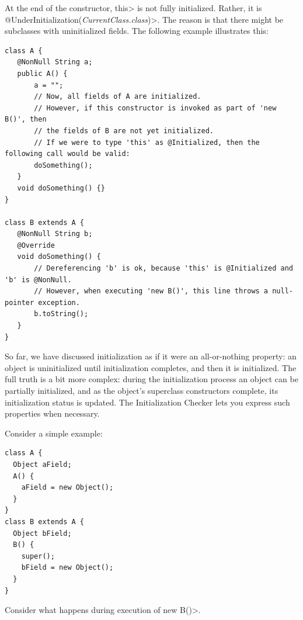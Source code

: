
At the end of the constructor, \<this> is not fully initialized. Rather,
it is \<@UnderInitialization(\emph{CurrentClass.class})>.
The reason is that there might be subclasses with uninitialized fields.
The following example illustrates this:

\begin{Verbatim}
class A {
   @NonNull String a;
   public A() {
       a = "";
       // Now, all fields of A are initialized.
       // However, if this constructor is invoked as part of 'new B()', then
       // the fields of B are not yet initialized.
       // If we were to type 'this' as @Initialized, then the following call would be valid:
       doSomething();
   }
   void doSomething() {}
}

class B extends A {
   @NonNull String b;
   @Override
   void doSomething() {
       // Dereferencing 'b' is ok, because 'this' is @Initialized and 'b' is @NonNull.
       // However, when executing 'new B()', this line throws a null-pointer exception.
       b.toString();
   }
}
\end{Verbatim}



So far, we have discussed initialization as if it were an all-or-nothing property:
an object is uninitialized until initialization completes, and then it is initialized.  The full truth is a bit more complex:  during the
initialization process an object can be partially initialized, and as the
object's superclass constructors complete, its initialization status is updated.  The
Initialization Checker lets you express such properties when necessary.

Consider a simple example:

\begin{Verbatim}
class A {
  Object aField;
  A() {
    aField = new Object();
  }
}
class B extends A {
  Object bField;
  B() {
    super();
    bField = new Object();
  }
}
\end{Verbatim}

Consider what happens during execution of \<new B()>.

